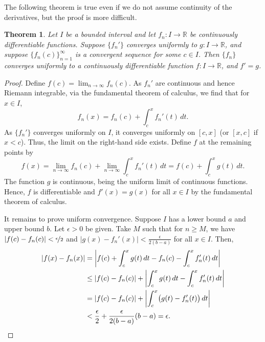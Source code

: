 \documentclass[12pt,openany]{book}
\newcommand{\abs}[1]{\left\lvert {#1} \right\rvert}
\newcommand{\R}{{\mathbb{R}}}
\theoremstyle{plain}
\newtheorem{thm}{Theorem}[section]
\theoremstyle{remark}
\theoremstyle{definition}
\theoremstyle{exercise}
\theoremstyle{example}
\begin{document}
The following theorem is true even if 
we do not assume continuity of the derivatives, but the proof is more
difficult.

\begin{thm} \label{thm:dersconverge}
Let $I$ be a bounded interval and let
$f_n \colon I \to \R$ be continuously differentiable functions.
Suppose $\{ f_n' \}$ converges uniformly to $g \colon I \to \R$,
and suppose $\{ f_n(c) \}_{n=1}^\infty$ is a
convergent sequence for some $c \in I$.  Then $\{ f_n \}$ converges uniformly to 
a continuously differentiable function $f \colon I \to \R$, and $f' = g$.
\end{thm}

\begin{proof}
Define $f(c) = \lim_{n\to \infty} f_n(c)$.
As $f_n'$ are continuous and hence Riemann integrable,
via the fundamental theorem of calculus, we find that for $x \in I$,
\begin{equation*}
f_n(x) = f_n(c) + \int_c^x f_n' (t)\, dt.
\end{equation*}
As $\{ f_n' \}$ converges uniformly on $I$, it converges uniformly
on $[c,x]$ (or $[x,c]$ if $x < c$).
Thus, the limit on the right-hand side exists.
Define $f$ at the remaining points by
\begin{equation*}
f(x) =
\lim_{n\to\infty} f_n(c) + \lim_{n\to\infty} \int_c^x f_n' (t)\, dt
=
f(c) + \int_c^x g(t)\,dt .
\end{equation*}
The function $g$ is continuous, being the uniform limit of continuous
functions.  Hence, $f$ is differentiable and $f'(x) = g(x)$ for all $x \in I$
by the fundamental theorem of calculus.

It remains to prove
uniform convergence.
Suppose $I$ has a lower bound $a$ and upper bound $b$.
Let $\epsilon > 0$ be given.  Take $M$
such that for $n \geq M$, we have
$\abs{f(c)-f_n(c)} < \nicefrac{\epsilon}{2}$
and
$\abs{g(x)-f_n'(x)} < \frac{\epsilon}{2(b-a)}$
for all $x \in I$.  Then,
\begin{equation*}
\begin{split}
\abs{f(x) - f_n(x)} & =
\abs{f(c) + \int_c^x g(t) \, dt - f_n(c) - \int_c^x f_n'(t)\,dt}
\\
& \leq
\abs{f(c) - f_n(c)} + \abs{\int_c^x g(t)\,dt - \int_c^x f_n'(t)\,dt}
\\
& =
\abs{f(c) - f_n(c)} + \abs{\int_c^x \bigl(g(t) - f_n'(t)\bigr) \, dt}
\\
& <
\frac{\epsilon}{2}
+
\frac{\epsilon}{2(b-a)}
(b-a)
=\epsilon. \qedhere
\end{split}
\end{equation*}
\end{proof}
\end{document}
